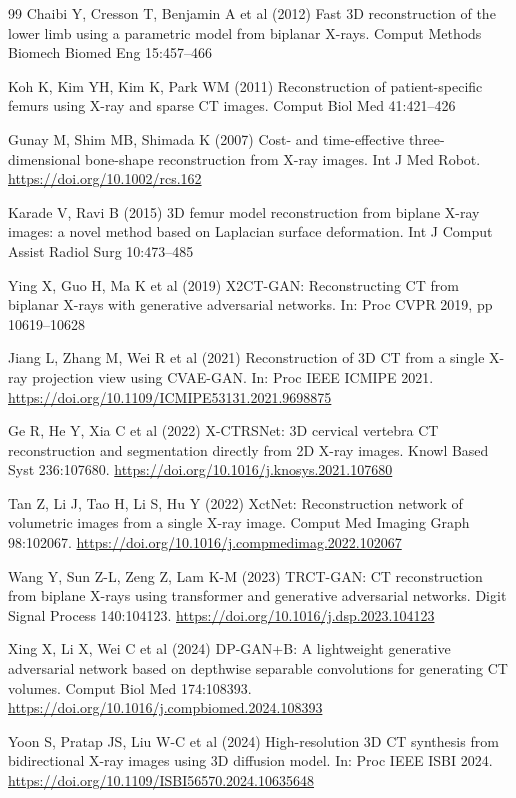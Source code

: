 \documentclass[10pt,twocolumn,a4paper]{article}
\begin{document}
\begin{thebibliography}{99}
Chaibi Y, Cresson T, Benjamin A et al (2012) Fast 3D reconstruction of the
lower limb using a parametric model from biplanar X-rays. Comput Methods
Biomech Biomed Eng 15:457--466

Koh K, Kim YH, Kim K, Park WM (2011) Reconstruction of patient-specific
femurs using X-ray and sparse CT images. Comput Biol Med 41:421--426

Gunay M, Shim MB, Shimada K (2007) Cost- and time-effective three-dimensional
bone-shape reconstruction from X-ray images. Int J Med Robot.
\url{https://doi.org/10.1002/rcs.162}

Karade V, Ravi B (2015) 3D femur model reconstruction from biplane X-ray images:
a novel method based on Laplacian surface deformation. Int J Comput Assist
Radiol Surg 10:473--485

Ying X, Guo H, Ma K et al (2019) X2CT-GAN: Reconstructing CT from biplanar
X-rays with generative adversarial networks. In: Proc CVPR 2019, pp 10619--10628

Jiang L, Zhang M, Wei R et al (2021) Reconstruction of 3D CT from a single
X-ray projection view using CVAE-GAN. In: Proc IEEE ICMIPE 2021.
\url{https://doi.org/10.1109/ICMIPE53131.2021.9698875}

Ge R, He Y, Xia C et al (2022) X-CTRSNet: 3D cervical vertebra CT
reconstruction and segmentation directly from 2D X-ray images. Knowl Based
Syst 236:107680. \url{https://doi.org/10.1016/j.knosys.2021.107680}

Tan Z, Li J, Tao H, Li S, Hu Y (2022) XctNet: Reconstruction network of
volumetric images from a single X-ray image. Comput Med Imaging Graph
98:102067. \url{https://doi.org/10.1016/j.compmedimag.2022.102067}

Wang Y, Sun Z-L, Zeng Z, Lam K-M (2023) TRCT-GAN: CT reconstruction from
biplane X-rays using transformer and generative adversarial networks. Digit
Signal Process 140:104123. \url{https://doi.org/10.1016/j.dsp.2023.104123}

Xing X, Li X, Wei C et al (2024) DP-GAN+B: A lightweight generative adversarial
network based on depthwise separable convolutions for generating CT volumes.
Comput Biol Med 174:108393.
\url{https://doi.org/10.1016/j.compbiomed.2024.108393}

Yoon S, Pratap JS, Liu W-C et al (2024) High-resolution 3D CT synthesis from
bidirectional X-ray images using 3D diffusion model. In: Proc IEEE ISBI 2024.
\url{https://doi.org/10.1109/ISBI56570.2024.10635648}


\end{thebibliography}
\end{document}
